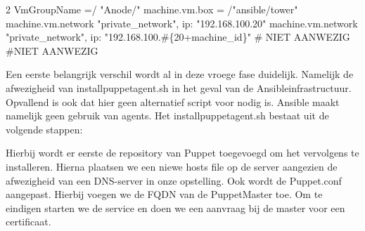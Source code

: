 2 VmGroupName =/ "Anode/"  machine.vm.box = /"ansible/tower"   machine.vm.network "private\_network", ip: "192.168.100.20"   machine.vm.network "private\_network", ip: "192.168.100.\#\{20+machine\_id\}"    \# NIET AANWEZIG \#NIET AANWEZIG\newline

Een eerste belangrijk verschil wordt al in deze vroege fase duidelijk. Namelijk de afwezigheid van installpuppetagent.sh in het geval van de Ansibleinfrastructuur. Opvallend is ook dat hier geen alternatief script voor nodig is. Ansible maakt namelijk geen gebruik van agents. Het installpuppetagent.sh bestaat uit de volgende stappen:



Hierbij wordt er eerste de repository van Puppet toegevoegd om het vervolgens te installeren. Hierna plaatsen we een niewe hosts file op de server aangezien de afwezigheid van een DNS-server in onze opstelling. Ook wordt de Puppet.conf aangepast. Hierbij voegen we de FQDN van de PuppetMaster toe. Om te eindigen starten we de service en doen we een aanvraag bij de master voor een certificaat.























